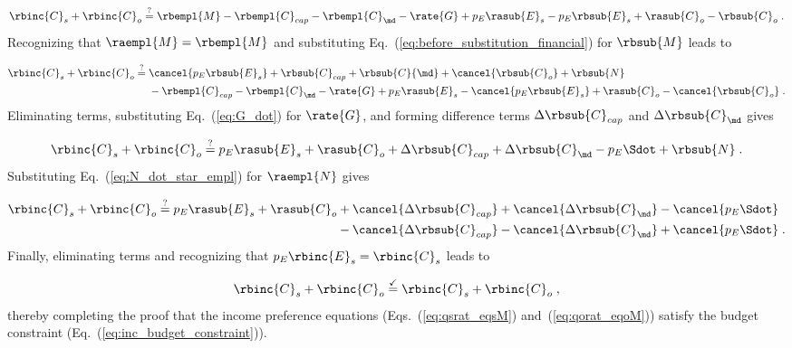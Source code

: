 \begin{equation}
  \rbinc{C}_s + \rbinc{C}_o \stackrel{?}{=} \rbempl{M} - \rbempl{C}_{cap} - \rbempl{C}_{\md} - \rate{G} 
            + p_E \rasub{E}_s - p_E \rbsub{E}_s + \rasub{C}_o - \rbsub{C}_o \; .
\end{equation}
%
Recognizing that $\raempl{M} = \rbempl{M}$ and 
substituting Eq.~(\ref{eq:before_substitution_financial}) for $\rbsub{M}$
leads to 

\begin{align}
  \rbinc{C}_s + \rbinc{C}_o \stackrel{?}{=} \; & \cancel{p_E \rbsub{E}_s} + \rbsub{C}_{cap} + \rbsub{C}{\md}
                                              + \cancel{\rbsub{C}_o} + \rbsub{N} \nonumber \\
                                            & - \rbempl{C}_{cap} - \rbempl{C}_{\md} - \rate{G}
                                              + p_E \rasub{E}_s - \cancel{p_E \rbsub{E}_s}
                                              + \rasub{C}_o - \cancel{\rbsub{C}_o} \; .
\end{align}
%
Eliminating terms, substituting Eq.~(\ref{eq:G_dot}) for $\rate{G}$, and 
forming difference terms $\Delta \rbsub{C}_{cap}$ and $\Delta \rbsub{C}_{\md}$ gives

\begin{equation}
  \rbinc{C}_s + \rbinc{C}_o \stackrel{?}{=} p_E \rasub{E}_s + \rasub{C}_o
                                            + \Delta \rbsub{C}_{cap} + \Delta \rbsub{C}_{\md}
                                            - p_E \Sdot + \rbsub{N} \; .
\end{equation}
%
Substituting Eq.~(\ref{eq:N_dot_star_empl}) for $\raempl{N}$ gives 

\begin{align}
  \rbinc{C}_s + \rbinc{C}_o \stackrel{?}{=} p_E \rasub{E}_s + \rasub{C}_o
        & + \cancel{\Delta \rbsub{C}_{cap}} + \cancel{\Delta \rbsub{C}_{\md}} - \cancel{p_E \Sdot} \nonumber \\
        & - \cancel{\Delta \rbsub{C}_{cap}} - \cancel{\Delta \rbsub{C}_{\md}} + \cancel{p_E \Sdot} \; .
\end{align}
%
Finally, eliminating terms and recognizing that $p_E \rbinc{E}_s = \rbinc{C}_s$ leads to

\begin{equation}
  \rbinc{C}_s + \rbinc{C}_o \stackrel{\checkmark}{=} \rbinc{C}_s + \rbinc{C}_o \; ,
\end{equation}
%
thereby completing the proof that the income preference equations
(Eqs.~(\ref{eq:qsrat_eqsM}) and~(\ref{eq:qorat_eqoM}))
satisfy the budget constraint
(Eq.~(\ref{eq:inc_budget_constraint})).
